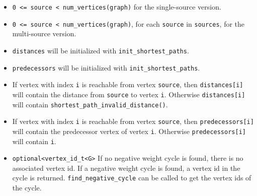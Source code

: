 \begin{itemdescr}
      \pnum\mandates
            \begin{itemize}
                  \item
                        \lstinline{0 <= source < num_vertices(graph)} for the single-source version. 
                  \item
                        \lstinline{0 <= source < num_vertices(graph)}, for each \lstinline{source} in \lstinline{sources}, 
                                   for the multi-source version.
            \end{itemize}
      \pnum\preconditions
            \begin{itemize}
                  \item
                        \lstinline{distances} will be initialized with \lstinline{init_shortest_paths}.
                  \item
                        \lstinline{predecessors} will be initialized with \lstinline{init_shortest_paths}.
            \end{itemize}
      \pnum\effects
            \begin{itemize}
                  \item
                        If vertex with index \lstinline{i} is reachable from vertex \lstinline{source}, then
                        \lstinline{distances[i]} will contain the distance from \lstinline{source} to vertex
                        \lstinline{i}.  Otherwise \lstinline{distances[i]} will contain
                        \lstinline{shortest_path_invalid_distance()}.
                  \item
                        If vertex with index \lstinline{i} is reachable
                        from vertex \lstinline{source}, then \lstinline{predecessors[i]} will contain the
                        predecessor vertex of vertex \lstinline{i}. Otherwise \lstinline{predecessors[i]} will contain
                        \lstinline{i}.
            \end{itemize}
      \pnum\returns 
            \begin{itemize}
                  \item \lstinline{optional<vertex_id_t<G>} If no negative weight cycle is found, 
                        there is no associated vertex id. If a negative weight cycle is found, a
                        vertex id in the cycle is returned. \lstinline{find_negative_cycle}
                        can be called to get the vertex ids of the cycle.

\end{itemize}
\end{itemdescr}
